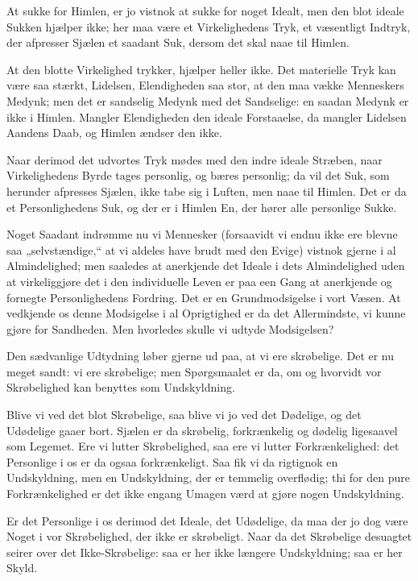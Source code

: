\documentclass[12pt,a4paper]{book}
\newcommand{\apage}[1]{\marginnote{\footnotesize\textit{[#1]}}}
\begin{document}
At sukke for Himlen, er jo vistnok at sukke for noget Idealt, men den blot
ideale Sukken hjælper ikke; her maa være et Virkelighedens Tryk, et
væsentligt Indtryk, der afpresser Sjælen et saadant Suk, dersom det skal
naae til Himlen.

At den blotte Virkelighed trykker, hjælper heller ikke. Det materielle
Tryk kan være saa stærkt, Lidelsen, Elendigheden saa stor, at den maa
vække Menneskers Medynk; men det er sandselig Medynk med det Sandselige:
en saadan Medynk er ikke i Himlen. Mangler Elendigheden den ideale
Forstaaelse, da mangler Lidelsen Aandens Daab, og Himlen ændser den ikke.

Naar derimod det udvortes Tryk mødes med den indre ideale Stræben, naar
Virkelighedens Byrde tages personlig, og bæres personlig; da vil det Suk,
som herunder afpresses Sjælen, ikke tabe sig i Luften, men naae til
Himlen. Det er da et Personlighedens Suk, og der er i Himlen En, der
hører alle personlige Sukke.

Noget Saadant indrømme nu vi Mennesker (forsaavidt vi endnu ikke ere
blevne saa „selvstændige,“ at vi aldeles have brudt med den Evige)
vistnok gjerne i al Almindelighed; men saaledes at anerkjende det Ideale
i dets Almindelighed uden at virkeliggjøre det i den individuelle Leven
er paa een Gang at anerkjende og fornegte Personlighedens Fordring. Det
er en Grundmodsigelse i vort Væsen. At vedkjende os denne Modsigelse i al
Oprigtighed er da det Allermindste, vi kunne gjøre for Sandheden. Men
hvorledes skulle vi udtyde Modsigelsen? \apage{95}

Den sædvanlige Udtydning løber gjerne ud paa, at vi ere skrøbelige. Det er
nu meget sandt: vi ere skrøbelige; men Spørgsmaalet er da, om og hvorvidt
vor Skrøbelighed kan benyttes som Undskyldning.

Blive vi ved det blot Skrøbelige, saa blive vi jo ved det Dødelige, og det
Udødelige gaaer bort. Sjælen er da skrøbelig, forkrænkelig og dødelig
ligesaavel som Legemet. Ere vi lutter Skrøbelighed, saa ere vi lutter
Forkrænkelighed: det Personlige i os er da ogsaa forkrænkeligt. Saa fik
vi da rigtignok en Undskyldning, men en Undskyldning, der er temmelig
overflødig; thi for den pure Forkrænkelighed er det ikke engang Umagen
værd at gjøre nogen Undskyldning.

Er det Personlige i os derimod det Ideale, det Udødelige, da maa der jo
dog være Noget i vor Skrøbelighed, der ikke er skrøbeligt. Naar da det
Skrøbelige desuagtet seirer over det Ikke-Skrøbelige: saa er her ikke
længere Undskyldning; saa er her Skyld.
\end{document}
